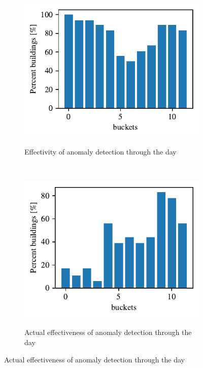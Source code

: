 \begin{figure}[H]
	\begin{subfigure}{.5\textwidth}
        \caption{Effectivity of anomaly detection through the day}
        \includegraphics[width=1\textwidth]{Figures/EC/ignored_buckets_dist.pdf}
        \label{fig:ignored_buckets_22}
    \end{subfigure}
    ~
    \begin{subfigure}{.5\textwidth}
        \caption{Actual effectiveness of anomaly detection through the day}
        \includegraphics[width=1\textwidth]{Figures/EC/all_ignored_buckets_dist_incl_act.pdf}
        \label{fig:ignored_buckets_act}
    \end{subfigure}
\end{figure}

